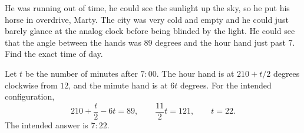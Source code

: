 He was running out of time, he could see the sunlight up the sky, so he put his horse in overdrive, Marty. The city was very cold and empty and he could just barely glance at the analog clock before being blinded by the light. He could see that the angle between the hands was 89 degrees and the hour hand just past 7. Find the exact time of day.

\begin{solution}
Let $t$ be the number of minutes after $7{:}00$. The hour hand is at
$210+t/2$ degrees clockwise from $12$, and the minute hand is at $6t$ degrees.
For the intended configuration,
\[
210+\frac{t}{2}-6t=89,
\qquad \frac{11}{2}t=121,
\qquad t=22.
\]
The intended answer is $\boxed{7{:}22}$.
\end{solution}
